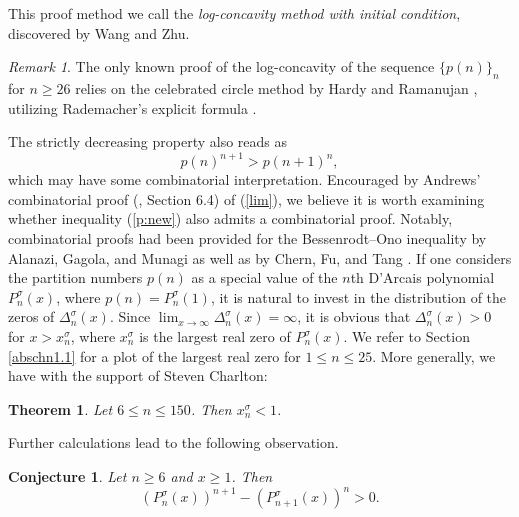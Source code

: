 \documentclass[11pt,reqno]{amsart}
\theoremstyle{plain}
\newtheorem{theorem}{Theorem}[section]
\newtheorem{conjecture}{Conjecture}
\theoremstyle{remark}
\newtheorem*{remark*}{Remark}
\theoremstyle{definition}
\numberwithin{equation}{section}
\begin{document}
This proof method we
call the {\it log-concavity method with initial condition\/}, discovered by Wang and Zhu. 
\begin{remark*} 
The only known proof
of the log-concavity of the sequence
$\{p(n)\}_n$ for $n \geq 26$ relies
on the celebrated circle method
by Hardy and Ramanujan \cite{HR17}, utilizing Rademacher's explicit formula \cite{Ra43}. 
\end{remark*}




The strictly decreasing property also reads as
\begin{equation} \label{p:new}
p(n)^{n+1} > p(n+1)^n,
\end{equation}
which may have some combinatorial interpretation.
Encouraged by Andrews' combinatorial proof (\cite{AE04}, Section 6.4) of (\ref{lim}), we believe it is worth examining
whether inequality (\ref{p:new}) also admits a combinatorial proof.
Notably,
combinatorial proofs had been provided
for
the Bessenrodt--Ono inequality \cite{BO16} by Alanazi, Gagola,
and Munagi \cite{AGM17} as well as
by Chern, Fu, and Tang \cite{CFT18}. 
%
%
If one considers the partition numbers $p(n)$ as a special value of
the $n$th D'Arcais polynomial $P_n^{\sigma}(x)$, where $p(n)=P_n^{\sigma}\left( 1\right) $,
it
is natural to invest in the distribution of the zeros  of $\Delta_n^{\sigma}\left( x\right)
$. Since $\lim_{x \to \infty} \Delta_n^{\sigma}(x)= \infty$,
it is obvious that $\Delta_n^{\sigma}(x) >0$ for $x >
x_n^{\sigma}$, where $x_n^{\sigma}$ is the largest real zero of $P_n^{\sigma}
\left( x\right)
$. We refer to Section \ref{abschn1.1}
for a plot of the largest real zero for $1 \leq n \leq 25$.
More generally, we have with the support of Steven Charlton:
\begin{theorem} \label{color} Let $6 \leq n \leq 150$. Then $x_n^{\sigma} <1$.
\end{theorem}
Further calculations lead to the following observation.
\begin{conjecture} 
\label{conj:sigma} Let $n \geq 6$ and $x \geq 1$. Then
\begin{equation*}
(P_n^{\sigma}(x))^{n+1} - (P_{n+1}^{\sigma}(x))^n >0.
\end{equation*}
\end{conjecture}
\end{document}
